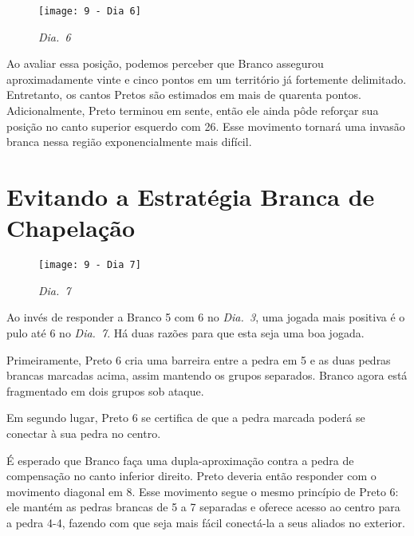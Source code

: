 \begin{wrapfigure}{l}{60mm}
    \vspace{-22.5pt}
    \begin{center}
        \texttt{[image: 9 - Dia 6]}
        \captionsetup{justification=centering}
        \caption*{\emph{Dia.\@~6}}
    \end{center}
    \vspace{-30pt}
\end{wrapfigure}

Ao avaliar essa posição, podemos perceber que Branco assegurou aproximadamente vinte e cinco pontos em um território já fortemente delimitado. Entretanto, os cantos Pretos são estimados em mais de quarenta pontos. Adicionalmente, Preto terminou em sente, então ele ainda pôde reforçar sua posição no canto superior esquerdo com 26. Esse movimento tornará uma invasão branca nessa região exponencialmente mais difícil.

\pagebreak

\section{Evitando a Estratégia Branca de Chapelação}

\begin{wrapfigure}{r}{60mm}
    \vspace{-27.5pt}
    \begin{center}
        \texttt{[image: 9 - Dia 7]}
        \captionsetup{justification=centering}
        \caption*{\emph{Dia.\@~7}}
    \end{center}
    \vspace{-30pt}
\end{wrapfigure}

Ao invés de responder a Branco 5 com 6 no \emph{Dia.\@~3}, uma jogada mais positiva é o pulo até 6 no \emph{Dia.\@~7}. Há duas razões para que esta seja uma boa jogada.

Primeiramente, Preto 6 cria uma barreira entre a pedra em 5 e as duas pedras brancas marcadas acima, assim mantendo os grupos separados. Branco agora está fragmentado em dois grupos sob ataque.

Em segundo lugar, Preto 6 se certifica de que a pedra marcada poderá se conectar à sua pedra no centro.

É esperado que Branco faça uma dupla-aproximação contra a pedra de compensação no canto inferior direito. Preto deveria então responder com o movimento diagonal em 8. Esse movimento segue o mesmo princípio de Preto 6: ele mantém as pedras brancas de 5 a 7 separadas e oferece acesso ao centro para a pedra 4-4, fazendo com que seja mais fácil conectá-la a seus aliados no exterior.


